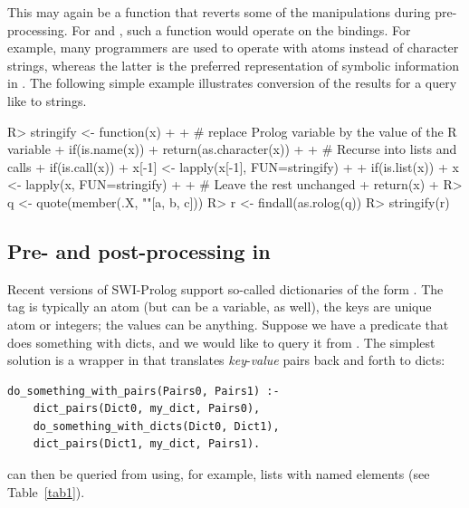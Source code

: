 \documentclass[article]{jss}
\begin{document}
This may again be a function that reverts some of the manipulations during
pre-processing. For  and , such a function would
operate on the bindings. For example, many  programmers are
used to operate with atoms instead of character strings, whereas the latter is
the preferred representation of symbolic information in . The
following simple example illustrates conversion of the results for a query
like  to strings.

\begin{Schunk}
\begin{Sinput}
R> stringify <- function(x)
+  {
+    # replace Prolog variable by the value of the R variable
+    if(is.name(x))
+      return(as.character(x))
+  
+    # Recurse into lists and calls
+    if(is.call(x))
+      x[-1] <- lapply(x[-1], FUN=stringify)
+  
+    if(is.list(x))
+      x <- lapply(x, FUN=stringify)
+  
+    # Leave the rest unchanged
+    return(x)
+  }
R> q <- quote(member(.X, ""[a, b, c]))
R> r <- findall(as.rolog(q))
R> stringify(r)
\end{Sinput}
\end{Schunk}

\subsection[Pre- and post-processing in Prolog]{Pre- and post-processing in }

Recent versions of SWI-Prolog support so-called dictionaries of the 
form . The tag is typically an 
atom (but can be a variable, as well), the keys are unique atom or integers;
the values can be anything. Suppose we have a  predicate that
does something with dicts, and we would like to query it from . The
simplest solution is a wrapper in  that 
translates \emph{key}-\emph{value} pairs 
back and forth to dicts:

\begin{verbatim}
do_something_with_pairs(Pairs0, Pairs1) :-
    dict_pairs(Dict0, my_dict, Pairs0),
    do_something_with_dicts(Dict0, Dict1),
    dict_pairs(Dict1, my_dict, Pairs1).
\end{verbatim}

 can then be queried from  using, 
for example, lists with named elements (see Table~\ref{tab1}).
\end{document}
